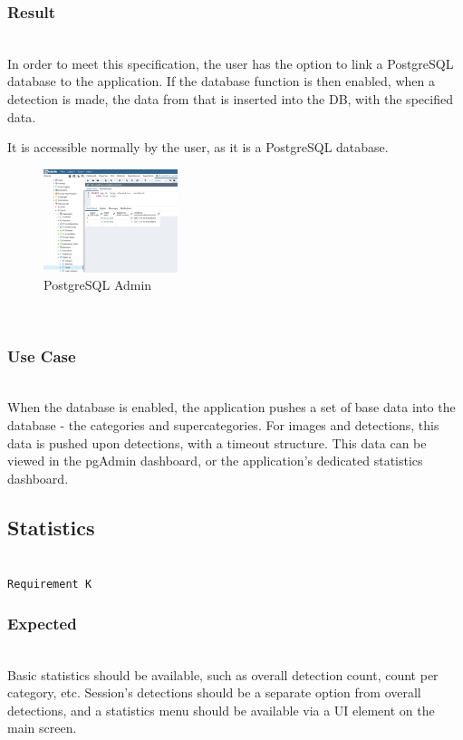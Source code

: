 \documentclass[conference]{IEEEtran}
\begin{document}
\subsubsection{Result}~\\
In order to meet this specification, the user has the option to link a PostgreSQL database to the application. If the database function is then enabled, when a detection is made, the data from that is inserted into the DB, with the specified data.

It is accessible normally by the user, as it is a PostgreSQL database.

\begin{figure}[!h]
    \centering
    \includegraphics[width=0.35\textwidth]{images/code_diagrams/pgadmin_db.eps}
    \caption{PostgreSQL Admin}
\end{figure}~\\

\subsubsection{Use Case}~\\
When the database is enabled, the application pushes a set of base data into the database - the categories and supercategories. For images and detections, this data is pushed upon detections, with a timeout structure. This data can be viewed in the pgAdmin dashboard, or the application's dedicated statistics dashboard. 

\subsection{Statistics}~\\
\texttt{Requirement K}~\\
\subsubsection{Expected}~\\
Basic statistics should be available, such as overall detection count, count per category, etc. Session's detections should be a separate option from overall detections, and a statistics menu should be available via a UI element on the main screen.~\\
\end{document}
